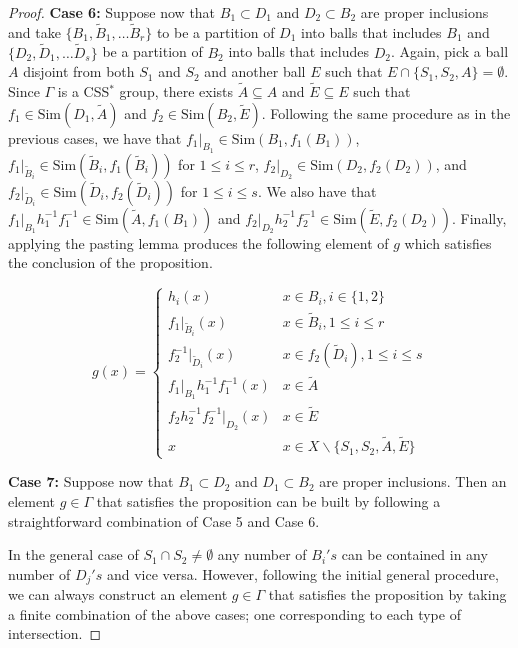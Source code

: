 \documentclass[12pt]{amsart}
\numberwithin{equation}{subsection}
\theoremstyle{definition}
\theoremstyle{definition}
\theoremstyle{remark}
\begin{document}
\begin{proof}
    \noindent\textbf{Case 6:}
    Suppose now that $B_1 \subset D_1$ and $D_2 \subset B_2$ are proper inclusions and take $\{B_1, \tilde B_1, \dots \tilde B_r \}$ to be a partition of $D_1$ into balls that includes $B_1$ and $\{D_2, \tilde D_1, \dots \tilde D_s \}$ be a partition of $B_2$ into balls that includes $D_2$. Again, pick a ball $A$ disjoint from both $S_1$ and $S_2$ and another ball $E$ such that $E \cap \{S_1, S_2, A\} = \emptyset$. Since $\Gamma$ is a CSS$^*$ group, there exists $\tilde A \subseteq A$ and $\tilde E \subseteq E$ such that $f_1 \in \text{Sim}(D_1, \tilde A)$ and $f_2 \in \text{Sim}(B_2, \tilde E)$. Following the same procedure as in the previous cases, we have that $f_1\vert_{B_1} \in \text{Sim}(B_1, f_1(B_1))$,  $f_1\vert_{\tilde B_i} \in \text{Sim}(\tilde B_i, f_1(\tilde B_i))$ for $1 \leq i \leq r$, $f_2\vert_{D_2} \in \text{Sim}(D_2, f_2(D_2))$, and $f_2\vert_{\tilde D_i} \in \text{Sim}(\tilde D_i, f_2(\tilde D_i))$ for $1 \leq i \leq s$.  We also have that $f_1\vert_{B_1}h_1^{-1}f_1^{-1} \in \text{Sim}(\tilde A,f_1(B_1))$ and $f_2\vert_{D_2}h_2^{-1}f_2^{-1} \in \text{Sim}(\tilde E, f_2(D_2))$. Finally, applying the pasting lemma produces the following element of $g$ which satisfies the conclusion of the proposition.  

     \[ g(x) = \begin{cases} h_i(x) & x \in B_i, i\in\{1,2\}  \\
     f_1\vert_{\tilde B_i}(x) & x \in \tilde B_i, 1 \leq i \leq r\\
        f^{-1}_2\vert_{\tilde D_i}(x) & x \in f_2(\tilde D_i), 1 \leq i \leq s\\
    f_1\vert_{B_1}h_1^{-1}f_1^{-1} (x) & x\in \tilde A\\
    f_2h_2^{-1}f_2^{-1}\vert_{D_2} (x) & x\in \tilde E\\
    x & x \in X \backslash \{S_1, S_2, \tilde A, \tilde E\}
    \end{cases}
    \]

    \noindent \textbf{Case 7:} Suppose now that $B_1 \subset D_2$ and $D_1 \subset B_2$ are proper inclusions. Then an element $g \in \Gamma$ that satisfies the proposition can be built by following a straightforward combination of Case 5 and Case 6. 
    
    In the general case of $S_1 \cap S_2 \neq \emptyset$ any number of $B_i's$ can be contained in any number of $D_j's$ and vice versa. However, following the initial general procedure, we can always construct an element $g \in \Gamma$ that satisfies the proposition by taking a finite combination of the above cases; one corresponding to each type of intersection.

\end{proof}
\end{document}
